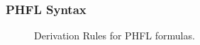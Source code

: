 \subsubsection{PHFL Syntax}

\begin{figure}
    \caption{Derivation Rules for PHFL formulas.}
    \label{figure:phfl-typing-rules}
\end{figure}

